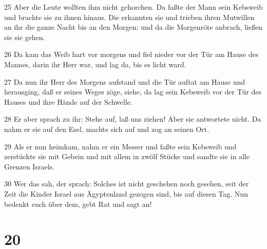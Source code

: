 \par 25 Aber die Leute wollten ihm nicht gehorchen. Da faßte der Mann sein Kebsweib und brachte sie zu ihnen hinaus. Die erkannten sie und trieben ihren Mutwillen an ihr die ganze Nacht bis an den Morgen; und da die Morgenröte anbrach, ließen sie sie gehen.
\par 26 Da kam das Weib hart vor morgens und fiel nieder vor der Tür am Hause des Mannes, darin ihr Herr war, und lag da, bis es licht ward.
\par 27 Da nun ihr Herr des Morgens aufstand und die Tür auftat am Hause und herausging, daß er seines Weges zöge, siehe, da lag sein Kebsweib vor der Tür des Hauses und ihre Hände auf der Schwelle.
\par 28 Er aber sprach zu ihr: Stehe auf, laß uns ziehen! Aber sie antwortete nicht. Da nahm er sie auf den Esel, machte sich auf und zog an seinen Ort.
\par 29 Als er nun heimkam, nahm er ein Messer und faßte sein Kebsweib und zerstückte sie mit Gebein und mit allem in zwölf Stücke und sandte sie in alle Grenzen Israels.
\par 30 Wer das sah, der sprach: Solches ist nicht geschehen noch gesehen, seit der Zeit die Kinder Israel aus Ägyptenland gezogen sind, bis auf diesen Tag. Nun bedenkt euch über dem, gebt Rat und sagt an!

\chapter{20}

